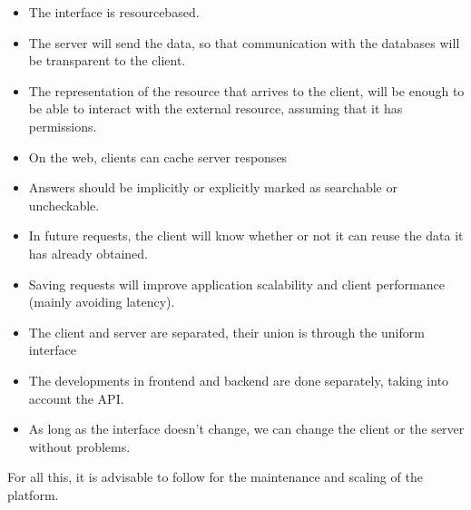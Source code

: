 \documentclass[letterpaper,10pt,english]{sphinxmanual}
\begin{document}
\begin{itemize}
\item {} 
The interface is resource\sphinxhyphen{}based.

\item {} 
The server will send the data, so that communication with the databases will be transparent to the client.

\item {} 
The representation of the resource that arrives to the client, will be enough to be able to interact with the external resource, assuming that it has permissions.

\end{itemize}

\begin{itemize}
\item {} 
On the web, clients can cache server responses

\item {} 
Answers should be implicitly or explicitly marked as searchable or uncheckable.

\item {} 
In future requests, the client will know whether or not it can reuse the data it has already obtained.

\item {} 
Saving requests will improve application scalability and client performance (mainly avoiding latency).

\end{itemize}

\begin{itemize}
\item {} 
The client and server are separated, their union is through the uniform interface

\item {} 
The developments in frontend and backend are done separately, taking into account the API.

\item {} 
As long as the interface doesn’t change, we can change the client or the server without problems.

\end{itemize}

For all this, it is advisable to follow  for the maintenance and scaling of the platform.
\end{document}
